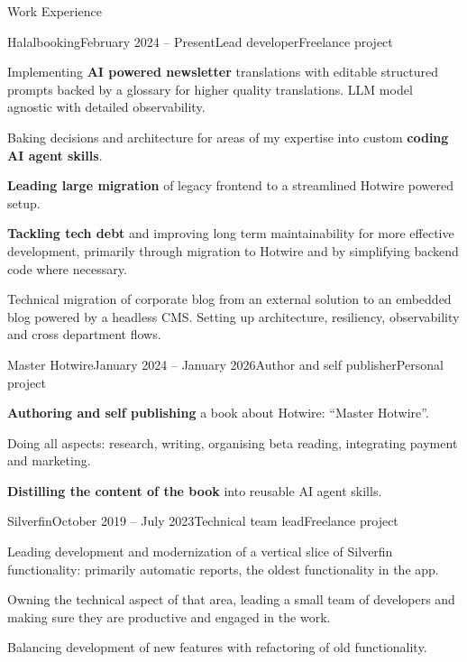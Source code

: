 \documentclass[
	11pt, %
]{resume} %
\begin{document}

\begin{rSection}{Work Experience}

	\begin{rSubsection}{Halalbooking}{February 2024 -- Present}{Lead developer}{Freelance project}
		\item Implementing \textbf{AI powered newsletter} translations with editable structured prompts backed by a glossary for higher quality translations. LLM model agnostic with detailed observability.
		\item Baking decisions and architecture for areas of my expertise into custom \textbf{coding AI agent skills}.
		\item \textbf{Leading large migration} of legacy frontend to a streamlined Hotwire powered setup.
		\item \textbf{Tackling tech debt} and improving long term maintainability for more effective development, primarily through migration to Hotwire and by simplifying backend code where necessary.
		\item Technical migration of corporate blog from an external solution to an embedded blog powered by a headless CMS. Setting up architecture, resiliency, observability and cross department flows.
	\end{rSubsection}

	\begin{rSubsection}{Master Hotwire}{January 2024 -- January 2026}{Author and self publisher}{Personal project}
		\item \textbf{Authoring and self publishing} a book about Hotwire: ``Master Hotwire''.
		\item Doing all aspects: research, writing, organising beta reading, integrating payment and marketing.
		\item \textbf{Distilling the content of the book} into reusable AI agent skills.
	\end{rSubsection}

	\begin{rSubsection}{Silverfin}{October 2019 -- July 2023}{Technical team lead}{Freelance project}
		\item Leading development and modernization of a vertical slice of Silverfin functionality: primarily automatic reports, the oldest functionality in the app.
		\item Owning the technical aspect of that area, leading a small team of developers and making sure they are productive and engaged in the work.
		\item Balancing development of new features with refactoring of old functionality.
	\end{rSubsection}


\end{rSection}
\end{document}

